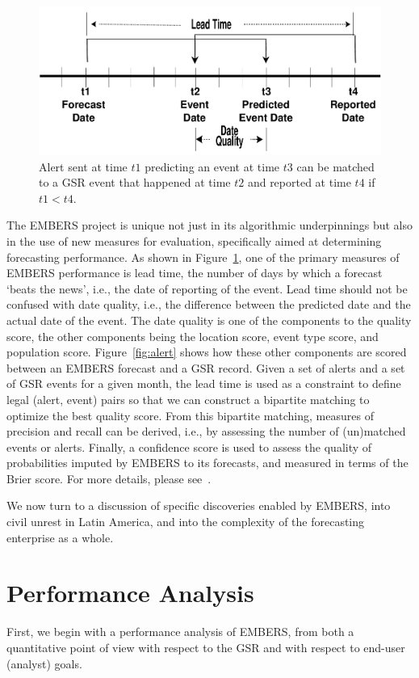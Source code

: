 \documentclass[11pt,a4paper,extrafontsizes,oneside]{article}
\begin{document}
\begin{figure}
\includegraphics[width=\columnwidth]{timeline}
\caption{Alert sent at time $t1$ predicting an event at time $t3$
can be matched to a GSR event that happened at time $t2$ and reported
at time $t4$ if $t1 < t4$.}
\label{fig:leadtime}
\end{figure}

The EMBERS project is unique not just in its algorithmic underpinnings but also in the use of new measures
for evaluation, specifically aimed at determining forecasting performance. As
shown in Figure~\ref{fig:leadtime},
one of the primary measures of EMBERS performance is lead time, the number of days by which a forecast
`beats the news', i.e., the date of reporting of the event. Lead time should not be confused with
date quality, i.e., the difference between the predicted date and the actual date of the event. The date
quality is one of the components to the quality score, the other components being the
location score, event type score, and population score.
Figure~\ref{fig:alert} 
shows how these other
components are scored between an EMBERS forecast and a GSR record. Given a set of alerts and a set of
GSR events for a given month, the lead time is used as a constraint to define legal (alert, event) pairs so that
we can construct a bipartite matching to optimize the best quality score. From this bipartite matching,
measures of precision and recall can be derived, i.e., by assessing the number of (un)matched events or
alerts. Finally, a confidence score is used to assess the quality of probabilities imputed by EMBERS to its
forecasts, and measured in terms of the Brier score. For more details, please
see~\cite{kdd:beating-the-news}.

We now turn to a discussion of specific discoveries enabled by EMBERS, into civil unrest in Latin America, and into
the complexity of the forecasting enterprise as a whole.

\section{Performance Analysis}
\label{sec:perf}
First, we begin with a performance analysis of EMBERS, from both a quantitative
point of view with respect to the GSR and with respect to end-user (analyst) goals.
\end{document}

